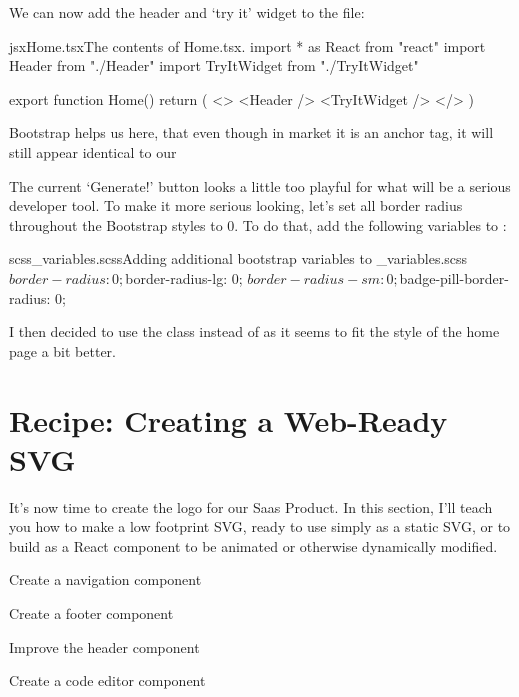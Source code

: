 \documentclass[paper=6in:9in,pagesize=pdftex,headinclude=on,footinclude=on,12pt]{scrbook}
\begin{document}
We can now add the header and `try it' widget to the   file:

\begin{codeInput}{jsx}{Home.tsx}{The contents of Home.tsx.}
import * as React from "react"
import { Header } from "./Header"
import { TryItWidget } from "./TryItWidget"

export function Home() {
  return (
    <>
      <Header />
      <TryItWidget />
    </>
  )
}  
\end{codeInput}

Bootstrap helps us here, that even though in market it is an anchor tag, it will still appear identical to our 


The current `Generate!' button looks a little too playful for what will be a serious developer tool. To make it more serious looking, let's set all border radius throughout the Bootstrap styles to 0. To do that, add the following variables to :

\begin{codeInput}{scss}{\_variables.scss}{Adding additional bootstrap variables to \_variables.scss}
$border-radius: 0;
$border-radius-lg: 0;
$border-radius-sm: 0;
$badge-pill-border-radius: 0;
\end{codeInput}

I then decided to use the class  instead of  as it seems to fit the style of the home page a bit better.

\section{Recipe: Creating a Web-Ready SVG}

It's now time to create the logo for our Saas Product. In this section, I'll teach you how to make a low footprint SVG, ready to use simply as a static SVG, or to build as a React component to be animated or otherwise dynamically modified.

\begin{arrows}
\item Create a navigation component
\item Create a footer component
\item Improve the header component
\item Create a code editor component
\end{arrows}
\end{document}
